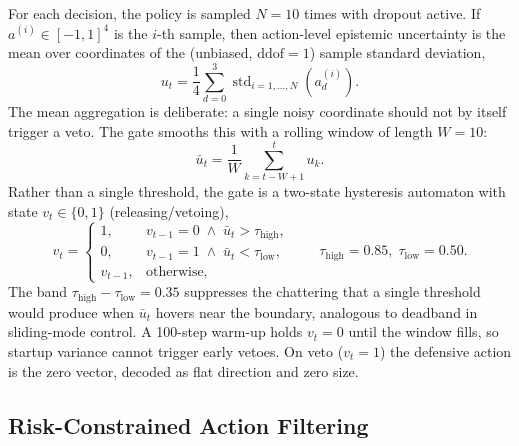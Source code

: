 \documentclass[10pt]{article}
\newcommand{\std}{\operatorname{std}}
\begin{document}
For each decision, the policy is sampled \(N=10\) times with dropout active. If
\(a^{(i)}\in[-1,1]^4\) is the \(i\)-th sample, then action-level epistemic uncertainty is the
mean over coordinates of the (unbiased, \(\mathrm{ddof}=1\)) sample standard deviation,
\[
	u_t=\frac{1}{4}\sum_{d=0}^{3}\std_{i=1,\ldots,N}\left(a_d^{(i)}\right).
\]
The mean aggregation is deliberate: a single noisy coordinate should not by itself trigger a
veto. The gate smooths this with a rolling window of length \(W=10\):
\[
	\bar{u}_t=\frac{1}{W}\sum_{k=t-W+1}^{t}u_k.
\]
Rather than a single threshold, the gate is a two-state hysteresis automaton with state
\(v_t\in\{0,1\}\) (releasing/vetoing),
\[
	v_t=
	\begin{cases}
		1, & v_{t-1}=0 \;\wedge\; \bar u_t>\tau_{\mathrm{high}},\\[2pt]
		0, & v_{t-1}=1 \;\wedge\; \bar u_t<\tau_{\mathrm{low}},\\[2pt]
		v_{t-1}, & \text{otherwise,}
	\end{cases}
	\qquad \tau_{\mathrm{high}}=0.85,\;\tau_{\mathrm{low}}=0.50.
\]
The band \(\tau_{\mathrm{high}}-\tau_{\mathrm{low}}=0.35\) suppresses the chattering that a
single threshold would produce when \(\bar u_t\) hovers near the boundary, analogous to
deadband in sliding-mode control. A 100-step warm-up holds \(v_t=0\) until the window fills, so
startup variance cannot trigger early vetoes. On veto (\(v_t=1\)) the defensive action is the
zero vector, decoded as flat direction and zero size.

\subsection{Risk-Constrained Action Filtering}
\end{document}
